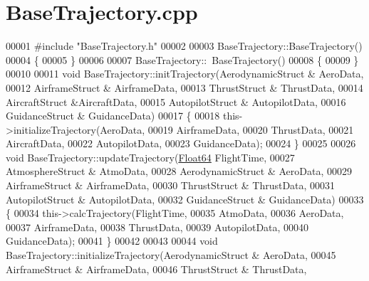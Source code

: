 \hypertarget{_base_trajectory_8cpp_source}{}\section{Base\+Trajectory.\+cpp}
\label{_base_trajectory_8cpp_source}

\begin{DoxyCode}
00001 \textcolor{preprocessor}{#include "BaseTrajectory.h"}
00002 
00003 BaseTrajectory::BaseTrajectory()
00004 \{
00005 \}
00006 
00007 BaseTrajectory::~BaseTrajectory()
00008 \{
00009 \}
00010 
00011 \textcolor{keywordtype}{void} BaseTrajectory::initTrajectory(AerodynamicStruct & AeroData,
00012                                     AirframeStruct & AirframeData,
00013                                     ThrustStruct & ThrustData,
00014                                     AircraftStruct &AircraftData,
00015                                     AutopilotStruct & AutopilotData,
00016                                     GuidanceStruct & GuidanceData)
00017 \{
00018     this->initializeTrajectory(AeroData,
00019                                 AirframeData,
00020                                 ThrustData,
00021                                 AircraftData,
00022                                 AutopilotData,
00023                                 GuidanceData);
00024 \}
00025 
00026 \textcolor{keywordtype}{void} BaseTrajectory::updateTrajectory(\hyperlink{group___tools_ga3f1431cb9f76da10f59246d1d743dc2c}{Float64} FlightTime, 
00027                                       AtmosphereStruct & AtmoData, 
00028                                       AerodynamicStruct & AeroData, 
00029                                       AirframeStruct & AirframeData, 
00030                                       ThrustStruct & ThrustData, 
00031                                       AutopilotStruct & AutopilotData, 
00032                                       GuidanceStruct & GuidanceData)
00033 \{
00034     this->calcTrajectory(FlightTime,
00035                         AtmoData,
00036                         AeroData,
00037                         AirframeData,
00038                         ThrustData,
00039                         AutopilotData,
00040                         GuidanceData);
00041 \}
00042 
00043 
00044 \textcolor{keywordtype}{void} BaseTrajectory::initializeTrajectory(AerodynamicStruct & AeroData,
00045                                         AirframeStruct & AirframeData,
00046                                         ThrustStruct & ThrustData,

\end{DoxyCode}
